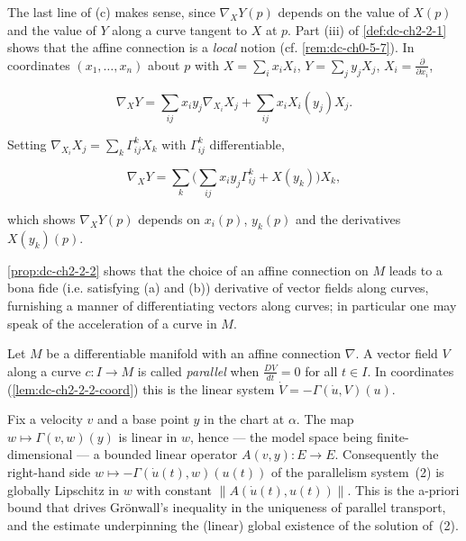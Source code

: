 \begin{remark}[Remark 2.3]
  \label{rem:dc-ch2-2-3}
  The last line of (c) makes sense, since $\nabla_X Y(p)$ depends on the value of
  $X(p)$ and the value of $Y$ along a curve tangent to $X$ at $p$. Part (iii) of
  \cref{def:dc-ch2-2-1} shows that the affine connection is a \emph{local} notion (cf. \cref{rem:dc-ch0-5-7}). In coordinates $(x_1,\dots,x_n)$ about $p$ with
  $X=\sum_i x_i X_i$, $Y=\sum_j y_j X_j$, $X_i=\frac{\partial}{\partial x_i}$,
  
  $$
  \nabla_X Y=\sum_{ij}x_i y_j\nabla_{X_i}X_j+\sum_{ij}x_i X_i(y_j)X_j.
  $$
  
  Setting $\nabla_{X_i}X_j=\sum_k\Gamma_{ij}^k X_k$ with $\Gamma_{ij}^k$
  differentiable,
  
  $$
  \nabla_X Y=\sum_k\Big(\sum_{ij}x_i y_j\Gamma_{ij}^k+X(y_k)\Big)X_k,
  $$
  
  which shows $\nabla_X Y(p)$ depends on $x_i(p)$, $y_k(p)$ and the derivatives
  $X(y_k)(p)$.
\end{remark}

\begin{remark}[Remark 2.4]
  \label{rem:dc-ch2-2-4}
  \cref{prop:dc-ch2-2-2} shows that the choice of an affine connection on $M$ leads to a
  bona fide (i.e. satisfying (a) and (b)) derivative of vector fields along curves,
  furnishing a manner of differentiating vectors along curves; in particular one
  may speak of the acceleration of a curve in $M$.
\end{remark}

\begin{definition}
  \label{def:dc-ch2-2-5}
  \leanok
  Let $M$ be a differentiable manifold with an affine connection $\nabla$. A vector
  field $V$ along a curve $c:I\to M$ is called \emph{parallel} when $\frac{DV}{dt}=0$ for
  all $t\in I$. In coordinates (\cref{lem:dc-ch2-2-2-coord}) this is the linear
  system $\dot V=-\Gamma(\dot u,V)(u)$.
\end{definition}

\begin{lemma}
  \label{lem:dc-ch2-2-6-coeff}
  \leanok
  Fix a velocity $v$ and a base point $y$ in the chart at $\alpha$. The map
  $w\mapsto\Gamma(v,w)(y)$ is linear in $w$, hence --- the model space being
  finite-dimensional --- a bounded linear operator $A(v,y)\colon E\to E$.
  Consequently the right-hand side $w\mapsto-\Gamma(\dot u(t),w)(u(t))$ of the
  parallelism system~(2) is globally Lipschitz in $w$ with constant
  $\lVert A(\dot u(t),u(t))\rVert$. This is the a-priori bound that drives
  Grönwall's inequality in the uniqueness of parallel transport, and the estimate
  underpinning the (linear) global existence of the solution of~(2).
\end{lemma}

